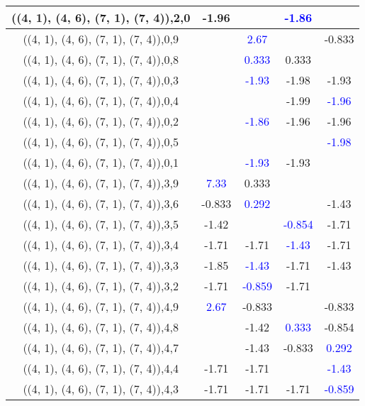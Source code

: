 \documentclass{article}
\begin{document}
\begin{center}
\begin{longtable}{|c|c|c|c|c|}
        	\hline
        	((4, 1), (4, 6), (7, 1), (7, 4)),2,0&-1.96&& \textcolor{blue}{-1.86}&\\
        	\hline
        	((4, 1), (4, 6), (7, 1), (7, 4)),0,9&& \textcolor{blue}{2.67}&&-0.833\\
        	\hline
        	((4, 1), (4, 6), (7, 1), (7, 4)),0,8&& \textcolor{blue}{0.333}&0.333&\\
        	\hline
        	((4, 1), (4, 6), (7, 1), (7, 4)),0,3&& \textcolor{blue}{-1.93}&-1.98&-1.93\\
        	\hline
        	((4, 1), (4, 6), (7, 1), (7, 4)),0,4&&&-1.99& \textcolor{blue}{-1.96}\\
        	\hline
        	((4, 1), (4, 6), (7, 1), (7, 4)),0,2&& \textcolor{blue}{-1.86}&-1.96&-1.96\\
        	\hline
        	((4, 1), (4, 6), (7, 1), (7, 4)),0,5&&&& \textcolor{blue}{-1.98}\\
        	\hline
        	((4, 1), (4, 6), (7, 1), (7, 4)),0,1&& \textcolor{blue}{-1.93}&-1.93&\\
        	\hline
        	((4, 1), (4, 6), (7, 1), (7, 4)),3,9& \textcolor{blue}{7.33}&0.333&&\\
        	\hline
        	((4, 1), (4, 6), (7, 1), (7, 4)),3,6&-0.833& \textcolor{blue}{0.292}&&-1.43\\
        	\hline
        	((4, 1), (4, 6), (7, 1), (7, 4)),3,5&-1.42&& \textcolor{blue}{-0.854}&-1.71\\
        	\hline
        	((4, 1), (4, 6), (7, 1), (7, 4)),3,4&-1.71&-1.71& \textcolor{blue}{-1.43}&-1.71\\
        	\hline
        	((4, 1), (4, 6), (7, 1), (7, 4)),3,3&-1.85& \textcolor{blue}{-1.43}&-1.71&-1.43\\
        	\hline
        	((4, 1), (4, 6), (7, 1), (7, 4)),3,2&-1.71& \textcolor{blue}{-0.859}&-1.71&\\
        	\hline
        	((4, 1), (4, 6), (7, 1), (7, 4)),4,9& \textcolor{blue}{2.67}&-0.833&&-0.833\\
        	\hline
        	((4, 1), (4, 6), (7, 1), (7, 4)),4,8&&-1.42& \textcolor{blue}{0.333}&-0.854\\
        	\hline
        	((4, 1), (4, 6), (7, 1), (7, 4)),4,7&&-1.43&-0.833& \textcolor{blue}{0.292}\\
        	\hline
        	((4, 1), (4, 6), (7, 1), (7, 4)),4,4&-1.71&-1.71&& \textcolor{blue}{-1.43}\\
        	\hline
        	((4, 1), (4, 6), (7, 1), (7, 4)),4,3&-1.71&-1.71&-1.71& \textcolor{blue}{-0.859}\\

\end{longtable}
\end{center}
\end{document}
